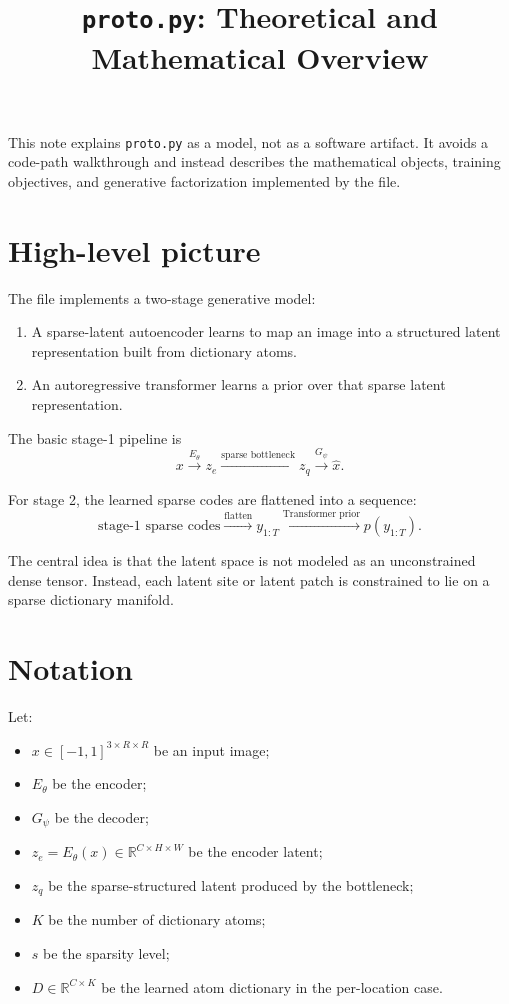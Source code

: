\documentclass[11pt]{article}
\title{\texttt{proto.py}: Theoretical and Mathematical Overview}
\date{}
\newcommand{\R}{\mathbb{R}}
\begin{document}
\maketitle

This note explains \texttt{proto.py} as a model, not as a software artifact. It avoids a code-path walkthrough and instead describes the mathematical objects, training objectives, and generative factorization implemented by the file.

\section{High-level picture}

The file implements a two-stage generative model:

\begin{enumerate}
  \item A sparse-latent autoencoder learns to map an image into a structured latent representation built from dictionary atoms.
  \item An autoregressive transformer learns a prior over that sparse latent representation.
\end{enumerate}

The basic stage-1 pipeline is
\[
x \xrightarrow{E_\theta} z_e \xrightarrow{\text{sparse bottleneck}} z_q \xrightarrow{G_\psi} \hat x.
\]

For stage 2, the learned sparse codes are flattened into a sequence:
\[
\text{stage-1 sparse codes} \xrightarrow{\text{flatten}} y_{1:T}
\xrightarrow{\text{Transformer prior}} p(y_{1:T}).
\]

The central idea is that the latent space is not modeled as an unconstrained dense tensor. Instead, each latent site or latent patch is constrained to lie on a sparse dictionary manifold.

\section{Notation}

Let:
\begin{itemize}
  \item $x \in [-1,1]^{3 \times R \times R}$ be an input image;
  \item $E_\theta$ be the encoder;
  \item $G_\psi$ be the decoder;
  \item $z_e = E_\theta(x) \in \R^{C \times H \times W}$ be the encoder latent;
  \item $z_q$ be the sparse-structured latent produced by the bottleneck;
  \item $K$ be the number of dictionary atoms;
  \item $s$ be the sparsity level;
  \item $D \in \R^{C \times K}$ be the learned atom dictionary in the per-location case.
\end{itemize}
\end{document}
